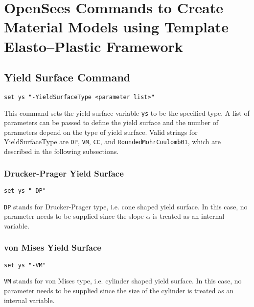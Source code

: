 \section{OpenSees Commands to Create Material Models using Template Elasto--Plastic Framework}
\label{EPTemplate_commands}




\subsection{Yield Surface Command}
\label{YS_Command}

\begin{verbatim}
set ys "-YieldSurfaceType <parameter list>"
\end{verbatim}

This  command sets the yield surface variable \texttt{ys} to be
the  specified  type.  A  list  of  parameters can be passed to
define the yield surface and the number of parameters depend on
the  type  of yield surface. Valid strings for YieldSurfaceType
are \texttt{DP}, \texttt{VM}, \texttt{CC}, and \texttt{RoundedMohrCoulomb01},  
which  are described in the following subsections.

\subsubsection{Drucker-Prager Yield Surface} 
\label{dp_ys}
\begin{verbatim}
set ys "-DP"
\end{verbatim}

\texttt{DP}  stands  for  Drucker-Prager type, i.e. cone shaped
yield  surface. In this case, no parameter needs to be supplied
since the slope $\alpha$ is treated as an internal variable.

\subsubsection{von Mises Yield Surface} 
\label{vm_ys}
\begin{verbatim}
set ys "-VM"
\end{verbatim}

\texttt{VM}  stands  for  von  Mises type, i.e. cylinder shaped
yield  surface. In this case, no parameter needs to be supplied
since  the  size  of  the  cylinder  is  treated as an internal
variable.

